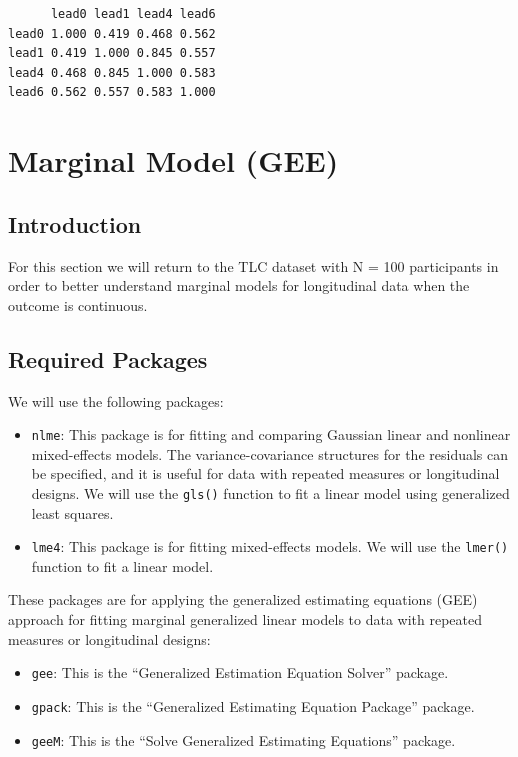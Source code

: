 \documentclass[
  letterpaper,
  DIV=11,
  numbers=noendperiod]{scrreprt}
\begin{document}
\begin{verbatim}
      lead0 lead1 lead4 lead6
lead0 1.000 0.419 0.468 0.562
lead1 0.419 1.000 0.845 0.557
lead4 0.468 0.845 1.000 0.583
lead6 0.562 0.557 0.583 1.000
\end{verbatim}

\hypertarget{sec-longi-GEE}{%
\chapter{Marginal Model (GEE)}\label{sec-longi-GEE}}

\hypertarget{introduction}{%
\section{Introduction}\label{introduction}}

For this section we will return to the TLC dataset with N = 100
participants in order to better understand marginal models for
longitudinal data when the outcome is continuous.

\hypertarget{required-packages}{%
\section{Required Packages}\label{required-packages}}

We will use the following packages:

\begin{itemize}
\item
  \texttt{nlme}: This package is for fitting and comparing Gaussian
  linear and nonlinear mixed-effects models. The variance-covariance
  structures for the residuals can be specified, and it is useful for
  data with repeated measures or longitudinal designs. We will use the
  \texttt{gls()} function to fit a linear model using generalized least
  squares.
\item
  \texttt{lme4}: This package is for fitting mixed-effects models. We
  will use the \texttt{lmer()} function to fit a linear model.
\end{itemize}

These packages are for applying the generalized estimating equations
(GEE) approach for fitting marginal generalized linear models to data
with repeated measures or longitudinal designs:

\begin{itemize}
\item
  \texttt{gee}: This is the ``Generalized Estimation Equation Solver''
  package.
\item
  \texttt{gpack}: This is the ``Generalized Estimating Equation
  Package'' package.
\item
  \texttt{geeM}: This is the ``Solve Generalized Estimating Equations''
  package.
\end{itemize}
\end{document}
